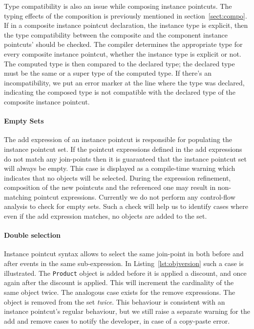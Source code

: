 \documentclass{acm_proc_article-sp}
\newcommand{\lstinln}[1]{\lstinline~#1~}
\begin{document}
Type compatibility is also an issue while composing instance pointcuts. The typing effects of the composition is previously mentioned in section~\ref{sect:compo}. If in a composite instance pointcut declaration, the instance type is explicit, then the type compatibility between the composite and the component instance pointcuts' should be checked. The compiler determines the appropriate type for every composite instance pointcut, whether the instance type is explicit or not. The computed type is then compared to the declared type; the declared type must be the same or a super type of the computed type. If there's an incompatibility, we put an error marker at the line where the type was declared, indicating the composed type is not compatible with the declared type of the composite instance pointcut. 


\paragraph*{Empty Sets} The add expression of an instance pointcut is responsible for populating the instance pointcut set. If the pointcut expressions defined in the add expressions do not match any join-points then it is guaranteed that the instance pointcut set will always be empty. This case is displayed as a compile-time warning which indicates that no objects will be selected. During the expression refinement, composition of the new pointcuts and the referenced one may result in non-matching pointcut expressions. 
Currently we do not perform any control-flow analysis to check for empty sets. Such a check will help us to identify cases where even if the add expression matches, no objects are added to the set.

\paragraph*{Double selection} Instance pointcut syntax allows to select the same join-point in both before and after events in the same sub-expression. In Listing~\ref{lst:objversion} such a case is illustrated. The \lstinln{Product} object is added before it is applied a discount, and once again after the discount is applied. This will increment the cardinality of the same object twice. The analogous case exists for the remove expressions. The object is removed from the set \emph{twice}. This behaviour is consistent with an instance pointcut's regular behaviour, but we still raise a separate warning for the add and remove cases to notify the developer, in case of a copy-paste error. 
\end{document}
